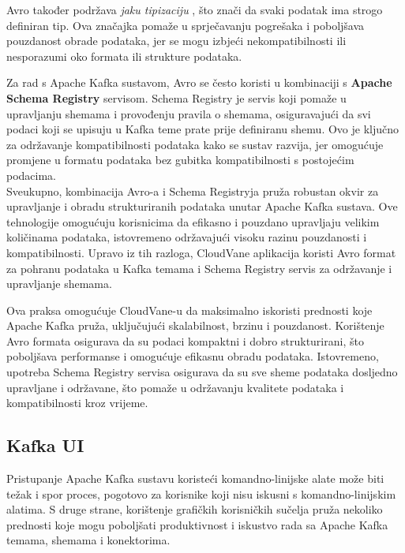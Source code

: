 \documentclass[times, utf8, diplomski]{fer}
\begin{document}
Avro također podržava \emph{jaku tipizaciju} , što znači da svaki podatak ima strogo definiran tip. Ova značajka pomaže u sprječavanju pogrešaka i poboljšava pouzdanost obrade podataka, jer se mogu izbjeći nekompatibilnosti ili nesporazumi oko formata ili strukture podataka.

Za rad s Apache Kafka sustavom, Avro se često koristi u kombinaciji s \textbf{Apache Schema Registry} servisom. Schema Registry je servis koji pomaže u upravljanju shemama i provođenju pravila o shemama, osiguravajući da svi podaci koji se upisuju u Kafka teme prate prije definiranu shemu. Ovo je ključno za održavanje kompatibilnosti podataka kako se sustav razvija, jer omogućuje promjene u formatu podataka bez gubitka kompatibilnosti s postojećim podacima. \\

Sveukupno, kombinacija Avro-a i Schema Registryja pruža robustan okvir za upravljanje i obradu strukturiranih podataka unutar Apache Kafka sustava. Ove tehnologije omogućuju korisnicima da efikasno i pouzdano upravljaju velikim količinama podataka, istovremeno održavajući visoku razinu pouzdanosti i kompatibilnosti. Upravo iz tih razloga, CloudVane aplikacija koristi Avro format za pohranu podataka u Kafka temama i Schema Registry servis za održavanje i upravljanje shemama.

Ova praksa omogućuje CloudVane-u da maksimalno iskoristi prednosti koje Apache Kafka pruža, uključujući skalabilnost, brzinu i pouzdanost. Korištenje Avro formata osigurava da su podaci kompaktni i dobro strukturirani, što poboljšava performanse i omogućuje efikasnu obradu podataka. Istovremeno, upotreba Schema Registry servisa osigurava da su sve sheme podataka dosljedno upravljane i održavane, što pomaže u održavanju kvalitete podataka i kompatibilnosti kroz vrijeme.

\subsection{Kafka UI}
\label{sec:kafka-ui}

Pristupanje Apache Kafka sustavu koristeći komandno-linijske alate  može biti težak i spor proces, pogotovo za korisnike koji nisu iskusni s komandno-linijskim alatima. S druge strane, korištenje grafičkih korisničkih sučelja  pruža nekoliko prednosti koje mogu poboljšati produktivnost i iskustvo rada sa Apache Kafka temama, shemama i konektorima.
\end{document}
